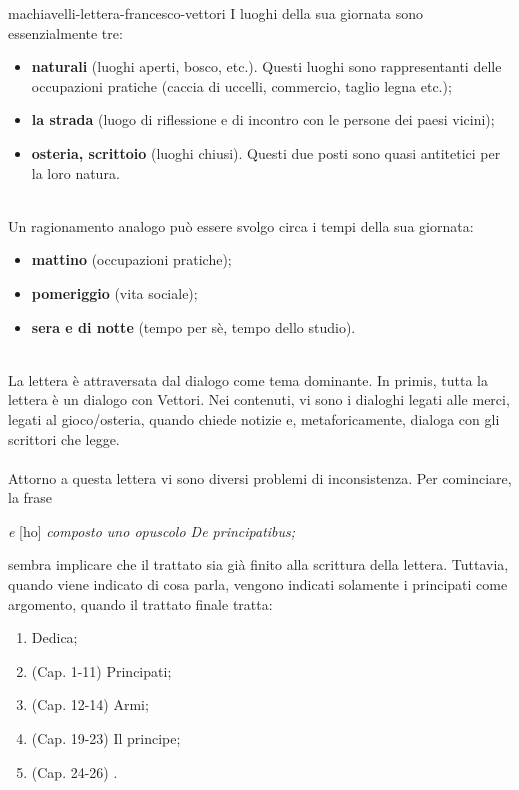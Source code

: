 \documentclass[preview]{standalone}
\begin{document}
\begin{snippet}{machiavelli-lettera-francesco-vettori}
    I luoghi della sua giornata sono essenzialmente tre:
    \begin{itemize}
        \item \textbf{naturali} (luoghi aperti, bosco, etc.).
            Questi luoghi sono rappresentanti delle occupazioni pratiche (caccia di uccelli, commercio, taglio legna etc.);
        \item \textbf{la strada} (luogo di riflessione e di incontro con le persone dei paesi vicini);
        \item \textbf{osteria, scrittoio} (luoghi chiusi). Questi due posti sono quasi antitetici per la loro natura.
    \end{itemize}
    \phantom{}\\
    Un ragionamento analogo può essere svolgo circa i tempi della sua giornata:
    \begin{itemize}
        \item \textbf{mattino} (occupazioni pratiche);
        \item \textbf{pomeriggio} (vita sociale);
        \item \textbf{sera e di notte} (tempo per sè, tempo dello studio).
    \end{itemize}
    \phantom{}\\
    La lettera è attraversata dal dialogo come tema dominante.
    In primis, tutta la lettera è un dialogo con Vettori.
    Nei contenuti, vi sono i dialoghi legati alle merci, legati al gioco/osteria,
    quando chiede notizie e, metaforicamente, dialoga con gli scrittori che legge.
    \\\\
    Attorno a questa lettera vi sono diversi problemi di inconsistenza.
    Per cominciare, la frase
    \begin{center}
        \textit{e} [ho] \textit{composto uno opuscolo De principatibus;}
    \end{center}
    sembra implicare che il trattato sia già finito alla scrittura della lettera.
    Tuttavia, quando viene indicato di cosa parla, vengono indicati solamente
    i principati come argomento, quando il trattato finale
    tratta:
    \begin{enumerate}
        \item Dedica;
        \item (Cap. 1-11) Principati;
        \item (Cap. 12-14) Armi;
        \item (Cap. 19-23) Il principe;
        \item (Cap. 24-26) .

\end{enumerate}
\end{snippet}
\end{document}
